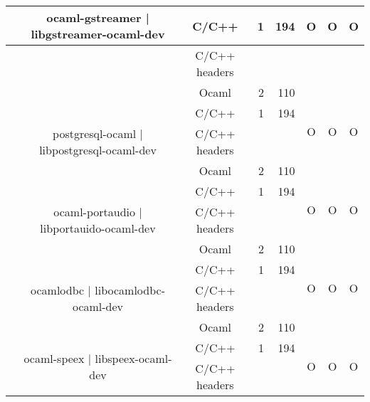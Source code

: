 \documentclass[11pt,a4paper]{article}
\begin{document}
\begin{table}[h,t]
\begin{tabular}{|>{\centering}m{3cm}| c|c|r|r| c| c|c|}
 &\multirow{3}{3cm}{ocaml-gstreamer | libgstreamer-ocaml-dev} & C/C++ & 1 & 194  & \multirow{2}{*}{O} & \multirow{2}{*}{O} &

 \multirow{2}{*}{O}\\

 \cline{3-5}
 & &                           C/C++ headers &  &  & & & \\

 \cline{3-5}   
 &                                  & Ocaml & 2 & 110  & & & \\       
 \cline{2-8}


 &\multirow{3}{3cm}{postgresql-ocaml | libpostgresql-ocaml-dev} & C/C++ & 1 & 194  & \multirow{2}{*}{O} & \multirow{2}{*}{O} &

 \multirow{2}{*}{O}\\
 \cline{3-5}
 & &                           C/C++ headers &  &  & & & \\

 \cline{3-5}   
 &                                  & Ocaml & 2 & 110  & & & \\       
 \cline{2-8}



 &\multirow{3}{3cm}{ocaml-portaudio | libportauido-ocaml-dev} & C/C++ & 1 & 194  & \multirow{2}{*}{O} & \multirow{2}{*}{O} &

 \multirow{2}{*}{O}\\
 \cline{3-5}
 & &                           C/C++ headers &  &  & & & \\

 \cline{3-5}   
 &                                  & Ocaml & 2 & 110  & & & \\       
 \cline{2-8}



 &\multirow{3}{3cm}{ocamlodbc | libocamlodbc-ocaml-dev} & C/C++ & 1 & 194  & \multirow{2}{*}{O} & \multirow{2}{*}{O} &

 \multirow{2}{*}{O}\\
 \cline{3-5}
 & &                           C/C++ headers &  &  & & & \\

 \cline{3-5}   
 &                                  & Ocaml & 2 & 110  & & & \\       
 \cline{2-8}


 &\multirow{3}{3cm}{ocaml-speex | libspeex-ocaml-dev} & C/C++ & 1 & 194  & \multirow{2}{*}{O} & \multirow{2}{*}{O} &

 \multirow{2}{*}{O}\\
 \cline{3-5}
 & &                           C/C++ headers &  &  & & & \\


\end{tabular}
\end{table}
\end{document}
